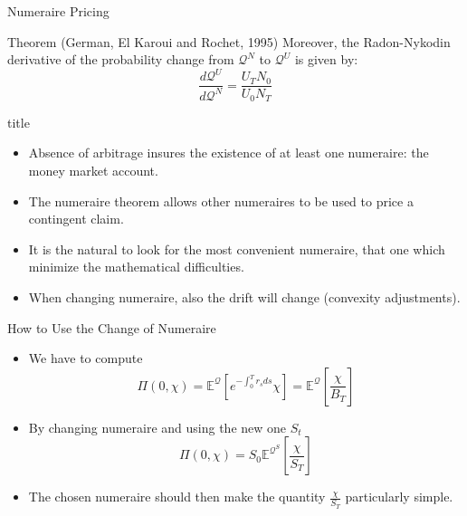 \documentclass{beamer}
\begin{document}
\begin{frame}{Numeraire Pricing}
\begin{block}{Theorem (German, El Karoui and Rochet, 1995)}
Moreover, the Radon-Nykodin derivative of the probability change from $\mathcal{Q}^N$ to $\mathcal{Q}^U$ is given by:
\begin{equation}
\frac{d\mathcal{Q}^U}{d\mathcal{Q}^N} = \frac{U_T N_0}{U_0 N_T} 
\end{equation}
\end{block}
\end{frame}


\begin{frame}{title}
\begin{itemize}
	\item Absence of arbitrage insures the existence of at least one numeraire: the money market account.
	\item The numeraire theorem allows other numeraires to be used to price a contingent claim.
	\item It is the natural to look for the most convenient numeraire, that one which minimize the mathematical difficulties.
	\item When changing numeraire, also the drift will change (convexity adjustments).
\end{itemize}
\end{frame}


\begin{frame}{How to Use the Change of Numeraire}
\begin{itemize}
	\item We have to compute
	\begin{equation}
		\Pi(0,\chi)=\mathbb{E}^{\mathcal{Q}}\left[e^{-\int_0^T r_s ds}\chi\right]=\mathbb{E}^{\mathcal{Q}}\left[\frac{\chi}{B_T}\right]
	\end{equation}
\item By changing numeraire and using the new one $S_t$
	\begin{equation}
	\Pi(0,\chi)=S_0\mathbb{E}^{\mathcal{Q}^S}\left[\frac{\chi}{S_T}\right]
\end{equation}
\item The chosen numeraire should then make the quantity $\frac{\chi}{S_T}$ particularly simple.
\end{itemize}
\end{frame}
\end{document}
